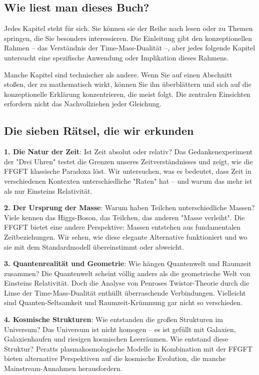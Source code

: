 \documentclass[11pt,openright,twoside]{book}
\begin{document}
\subsection*{Wie liest man dieses Buch?}

Jedes Kapitel steht für sich. Sie können sie der Reihe nach lesen oder zu Themen springen, die Sie besonders interessieren. Die Einleitung gibt den konzeptionellen Rahmen – das Verständnis der Time-Mass-Dualität –, aber jedes folgende Kapitel untersucht eine spezifische Anwendung oder Implikation dieses Rahmens.

Manche Kapitel sind technischer als andere. Wenn Sie auf einen Abschnitt stoßen, der zu mathematisch wirkt, können Sie ihn überblättern und sich auf die konzeptionelle Erklärung konzentrieren, die meist folgt. Die zentralen Einsichten erfordern nicht das Nachvollziehen jeder Gleichung.

\subsection*{Die sieben Rätsel, die wir erkunden}

\textbf{1. Die Natur der Zeit}: Ist Zeit absolut oder relativ? Das Gedankenexperiment der "Drei Uhren" testet die Grenzen unseres Zeitverständnisses und zeigt, wie die FFGFT klassische Paradoxa löst. Wir untersuchen, was es bedeutet, dass Zeit in verschiedenen Kontexten unterschiedliche "Raten" hat – und warum das mehr ist als nur Einsteins Relativität.

\textbf{2. Der Ursprung der Masse}: Warum haben Teilchen unterschiedliche Massen? Viele kennen das Higgs-Boson, das Teilchen, das anderen "Masse verleiht". Die FFGFT bietet eine andere Perspektive: Massen entstehen aus fundamentalen Zeitbeziehungen. Wir sehen, wie diese elegante Alternative funktioniert und wo sie mit dem Standardmodell übereinstimmt oder abweicht.

\textbf{3. Quantenrealität und Geometrie}: Wie hängen Quantenwelt und Raumzeit zusammen? Die Quantenwelt scheint völlig anders als die geometrische Welt von Einsteins Relativität. Doch die Analyse von Penroses Twistor-Theorie durch die Linse der Time-Mass-Dualität enthüllt überraschende Verbindungen. Vielleicht sind Quanten-Seltsamkeit und Raumzeit-Krümmung gar nicht so verschieden.

\textbf{4. Kosmische Strukturen}: Wie entstanden die großen Strukturen im Universum? Das Universum ist nicht homogen – es ist gefüllt mit Galaxien, Galaxienhaufen und riesigen kosmischen Leerräumen. Wie entstand diese Struktur? Peratts plasmakosmologische Modelle in Kombination mit der FFGFT bieten alternative Perspektiven auf die kosmische Evolution, die manche Mainstream-Annahmen herausfordern.
\end{document}

